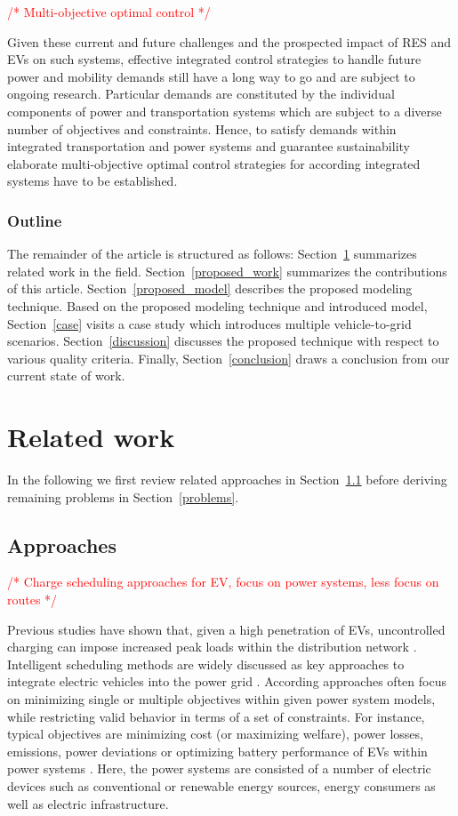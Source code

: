 \documentclass[conference]{IEEEtran}
\newcommand{\todo}[1]{\textcolor{red}{/* #1 */}}
\begin{document}
	\todo{Multi-objective optimal control}
	
	Given these current and future challenges and the prospected impact of RES and EVs on such systems, effective integrated control strategies to handle future power and mobility demands still have a long way to go and are subject to ongoing research. Particular demands are constituted by the individual components of power and transportation systems which are subject to a diverse number of objectives and constraints. Hence, to satisfy demands within integrated transportation and power systems and guarantee sustainability elaborate multi-objective optimal control strategies for according integrated systems have to be established.
		
	\subsubsection*{Outline}
	
	The remainder of the article is structured as follows: Section~\ref{related_work} summarizes related work in the field. Section~\ref{proposed_work} summarizes the contributions of this article. Section~\ref{proposed_model} describes the proposed modeling technique. Based on the proposed modeling technique and introduced model, Section~\ref{case} visits a case study which introduces multiple vehicle-to-grid scenarios. Section~\ref{discussion} discusses the proposed technique with respect to various quality criteria. Finally, Section~\ref{conclusion} draws a conclusion from our current state of work.
	
	\section{Related work}
	\label{related_work}
	
	In the following we first review related approaches in Section~\ref{approaches} before deriving remaining problems in Section~\ref{problems}.
	
	\subsection{Approaches}
	\label{approaches}
	
	\todo{Charge scheduling approaches for EV, focus on power systems, less focus on routes}
		
	Previous studies have shown that, given a high penetration of EVs, uncontrolled charging can impose increased peak loads within the distribution network \cite{lopes2009identifying}. Intelligent scheduling methods are widely discussed as key approaches to integrate electric vehicles into the power grid \cite{yang2015computational}. According approaches often focus on minimizing single or multiple objectives within given power system models, while restricting valid behavior in terms of a set of constraints. For instance, typical objectives are minimizing cost (or maximizing welfare), power losses, emissions, power deviations or optimizing battery performance of EVs within power systems \cite{yang2015computational}. Here, the power systems are consisted of a number of electric devices such as conventional or renewable energy sources, energy consumers as well as electric infrastructure.
	
\end{document}
